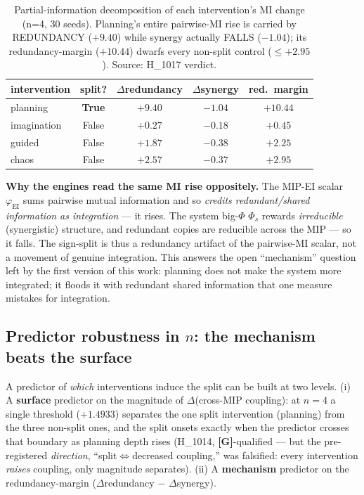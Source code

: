 \documentclass[11pt,a4paper]{article}
\providecommand{\tierGreen}{\textcolor{green!50!black}{\textbf{[G]}}}
\newcommand{\faithful}{\ensuremath{\varphi_{\mathrm{EI}}}}
\newcommand{\bigphi}{\ensuremath{\Phi_{s}}}
\begin{document}
\begin{table}[h]
\centering
\small
\begin{tabular}{lcccc}
\toprule
\textbf{intervention} & \textbf{split?} & \textbf{$\Delta$redundancy} & \textbf{$\Delta$synergy} & \textbf{red.\ margin} \\
\midrule
planning    & \textbf{True}  & $+9.40$ & $-1.04$ & $+10.44$ \\
imagination & False & $+0.27$ & $-0.18$ & $+0.45$ \\
guided      & False & $+1.87$ & $-0.38$ & $+2.25$ \\
chaos       & False & $+2.57$ & $-0.37$ & $+2.95$ \\
\bottomrule
\end{tabular}
\caption{Partial-information decomposition of each intervention's MI change
(n=4, 30 seeds). Planning's entire pairwise-MI rise is carried by REDUNDANCY
($+9.40$) while synergy actually FALLS ($-1.04$); its redundancy-margin
($+10.44$) dwarfs every non-split control ($\le +2.95$). Source: H\_1017 verdict.}
\label{tab:pid}
\end{table}

\noindent\textbf{Why the engines read the same MI rise oppositely.} The MIP-EI
scalar \faithful{} sums pairwise mutual information and so \emph{credits
redundant/shared information as integration} --- it rises. The system big-$\Phi$
\bigphi{} rewards \emph{irreducible} (synergistic) structure, and redundant
copies are reducible across the MIP --- so it falls. The sign-split is thus a
redundancy artifact of the pairwise-MI scalar, not a movement of genuine
integration. This answers the open ``mechanism'' question left by the first
version of this work: planning does not make the system more integrated; it
floods it with redundant shared information that one measure mistakes for
integration.

\subsection{Predictor robustness in $n$: the mechanism beats the surface}
\label{sec:predictor}

A predictor of \emph{which} interventions induce the split can be built at two
levels. (i) A \textbf{surface} predictor on the magnitude of $\Delta$(cross-MIP
coupling): at $n=4$ a single threshold ($+1.4933$) separates the one split
intervention (planning) from the three non-split ones, and the split onsets
exactly when the predictor crosses that boundary as planning depth rises
(H\_1014, \tierGreen-qualified --- but the pre-registered \emph{direction},
``split$\Leftrightarrow$decreased coupling,'' was falsified: every intervention
\emph{raises} coupling, only magnitude separates). (ii) A \textbf{mechanism}
predictor on the redundancy-margin ($\Delta$redundancy $-$ $\Delta$synergy).
\end{document}
